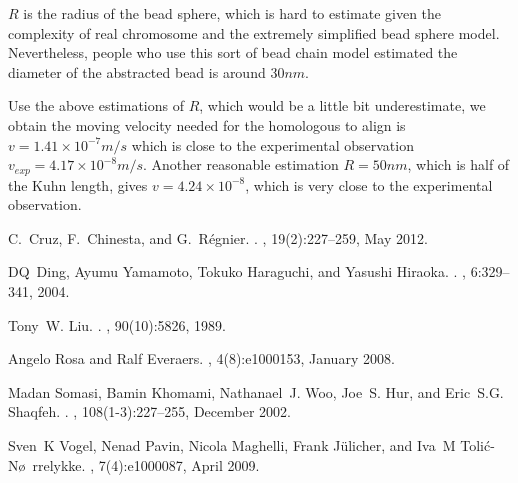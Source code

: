 \documentclass{article}
\begin{document}
$R$ is the radius of the bead sphere, which is hard to estimate given the complexity of real chromosome and the extremely simplified bead sphere model.
Nevertheless, people who use this sort of bead chain model estimated the diameter of the abstracted bead is around $30nm$\cite{Rosa2008}.

Use the above estimations of $R$, which would be a little bit underestimate, we obtain the moving velocity needed for the homologous to align is $v = 1.41\times10^{-7} m/s$ which is close to the experimental observation $v_{exp} = 4.17\times10^{-8}m/s$.
Another reasonable estimation $R=50nm$, which is half of the Kuhn length, gives $v = 4.24\times10^{-8}$, which is very close to the experimental observation.


% 


\begin{thebibliography}{1}

	C.~Cruz, F.~Chinesta, and G.~R\'{e}gnier.
	.
	,
	19(2):227--259, May 2012.

	DQ~Ding, Ayumu Yamamoto, Tokuko Haraguchi, and Yasushi Hiraoka.
	.
	, 6:329--341, 2004.

	Tony~W. Liu.
	.
	, 90(10):5826, 1989.

	Angelo Rosa and Ralf Everaers.
	, 4(8):e1000153, January 2008.

	Madan Somasi, Bamin Khomami, Nathanael~J. Woo, Joe~S. Hur, and Eric~S.G.
	Shaqfeh.
	.
	, 108(1-3):227--255,
	December 2002.

	Sven~K Vogel, Nenad Pavin, Nicola Maghelli, Frank J\"{u}licher, and Iva~M
	Toli\'{c}-N\o~rrelykke.
	, 7(4):e1000087, April 2009.

\end{thebibliography}
\end{document}
